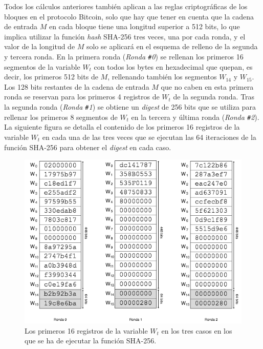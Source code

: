 \documentclass{article}
\begin{document}
        \vspace{3mm}
        
        Todos los cálculos anteriores también aplican a las reglas criptográficas de los bloques en el protocolo Bitcoin, solo que hay que tener en cuenta que la cadena de entrada $M$ en cada bloque tiene una longitud superior a 512 bits, lo que implica utilizar la función \textit{hash} SHA-256 tres veces, una por cada ronda, y el valor de la longitud de $M$ solo se aplicará en el esquema de relleno de la segunda y tercera ronda. En la primera ronda (\textit{Ronda \texttt{\#}0}) se rellenan los primeros 16 segmentos de la variable $W_t$ con todos los bytes en hexadecimal que quepan, es decir, los primeros 512 bits de $M$, rellenando también los segmentos $W_{14}$ y $W_{15}$. Los 128 bits restantes de la cadena de entrada $M$ que no caben en esta primera ronda se reservan para los primeros 4 registros de $W_t$ de la segunda ronda. Tras la segunda ronda (\textit{Ronda \texttt{\#}1}) se obtiene un \textit{digest} de 256 bits que se utiliza para rellenar los primeros 8 segmentos de $W_t$ en la tercera y última ronda (\textit{Ronda \texttt{\#}2}). La siguiente figura se detalla el contenido de los primeros 16 registros de la variable $W_{t}$ en cada una de las tres veces que se ejecutan las 64 iteraciones de la función SHA-256 para obtener el \textit{digest} en cada caso.
        \begin{figure}[H]
        \centering
            \includegraphics[scale=0.59]{img/Bitcoin_block_SHA_256_W0_W15_x3}
            \caption{Los primeros 16 registros de la variable $W_{t}$ en los tres casos en los que se ha de ejecutar la función SHA-256.}
        \end{figure}
        
\end{document}
